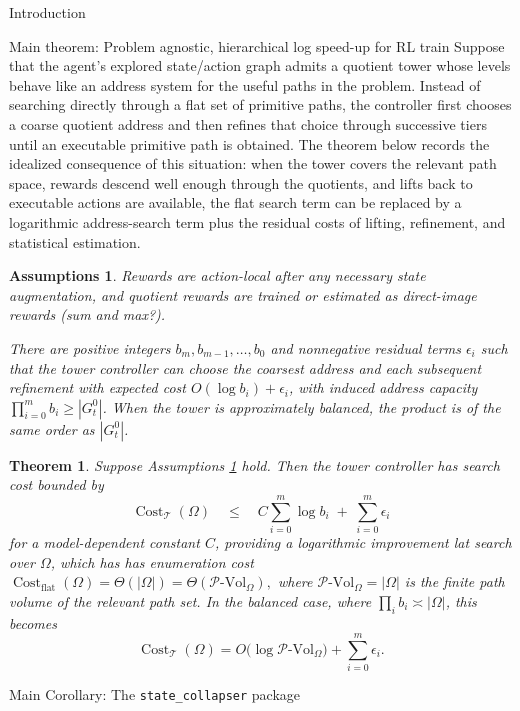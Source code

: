 \documentclass[11pt]{article}
\newtheorem{assumptions}[subsubsection]{Assumptions}
\newtheorem{theorem}[subsubsection]{Theorem}
\newcommand{\PVol}{\mathcal{P}\text{-}\mathrm{Vol}}
\newcommand{\cost}{\operatorname{Cost}}
\begin{document}
\begin{section}{Introduction}
\begin{subsection}{Main theorem: Problem agnostic, hierarchical log speed-up for RL train}
Suppose that the agent's explored state/action graph admits a quotient tower whose levels behave like an address system for the useful paths in the problem. Instead of searching directly through a flat set of primitive paths, the controller first chooses a coarse quotient address and then refines that choice through successive tiers until an executable primitive path is obtained. The theorem below records the idealized consequence of this situation: when the tower covers the relevant path space, rewards descend well enough through the quotients, and lifts back to executable actions are available, the flat search term can be replaced by a logarithmic address-search term plus the residual costs of lifting, refinement, and statistical estimation.

\begin{assumptions}\label{ass: simple ass}
Rewards are action-local after any necessary state augmentation, and quotient rewards are trained or estimated as direct-image rewards (sum and max?).
 

There are positive integers \(b_m,b_{m-1},\ldots,b_0\) and nonnegative residual terms \(\epsilon_i\) such that the tower controller can choose the coarsest address and each subsequent refinement with expected cost
$O(\log b_i)+\epsilon_i$, with induced address capacity $\prod_{i=0}^{m} b_i \ge |G^{0}_{t}|$.
When the tower is approximately balanced, the product is of the same order as \(|G^{0}_{t}|\).
\end{assumptions}


\begin{theorem}\label{theorem: main}
Suppose Assumptions \ref{ass: simple ass} hold.  Then the tower controller has search cost bounded by
$$
    \cost_{\mathcal{T}}(\Omega)
    \quad\le\quad
    C\sum_{i=0}^{m}\log b_i \;+\; \sum_{i=0}^{m}\epsilon_i
$$
for a model-dependent constant \(C\), providing a logarithmic improvement lat search over \(\Omega\), which has has enumeration cost $
    \cost_{\mathrm{flat}}(\Omega)=\Theta(|\Omega|)=\Theta(\PVol_{\Omega}),
$
where \(\PVol_{\Omega}=|\Omega|\) is the finite path volume of the relevant path set.  In the balanced case, where \(\prod_i b_i\asymp |\Omega|\), this becomes
$$
    \cost_{\mathcal{T}}(\Omega)
    =O\bigl(\log \PVol_{\Omega}\bigr)+\sum_{i=0}^{m}\epsilon_i.
$$
\end{theorem}

\end{subsection}

\begin{subsection}{Main Corollary: The \texttt{state\_collapser} package}


\end{subsection}
\end{section}
\end{document}

